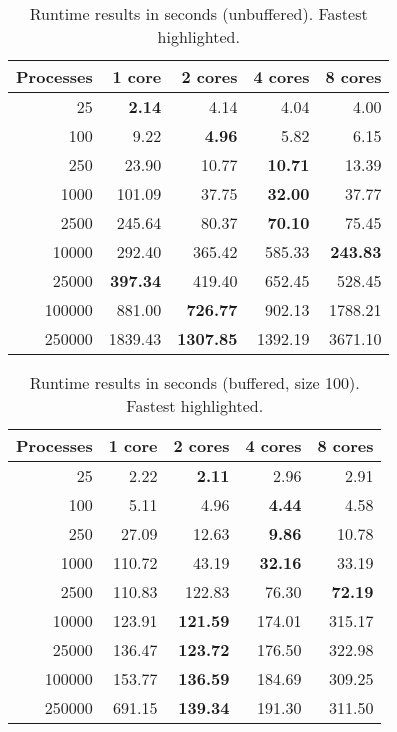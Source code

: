 \begin{table}
	\caption{Runtime results in seconds (unbuffered). Fastest highlighted.}
	\label{tab:runtime-unbuffered}
	\begin{tabular}{rrrrr}
		\hline
		Processes & 1 core & 2 cores & 4 cores & 8 cores\\
		\hline
		25 & \textbf{2.14} & 4.14 & 4.04 & 4.00 \\
		100 & 9.22 & \textbf{4.96} & 5.82 & 6.15 \\
		250 & 23.90 & 10.77 & \textbf{10.71} & 13.39 \\
		1000 & 101.09 & 37.75 & \textbf{32.00} & 37.77 \\
		2500 & 245.64 & 80.37 & \textbf{70.10} & 75.45 \\
		10000 & 292.40 & 365.42 & 585.33 & \textbf{243.83} \\
		25000 & \textbf{397.34} & 419.40 & 652.45 & 528.45 \\
		100000 & 881.00 & \textbf{726.77} & 902.13 & 1788.21 \\
		250000 & 1839.43 & \textbf{1307.85} & 1392.19 & 3671.10 \\
		\hline
	\end{tabular}
\end{table}

\begin{table}
	\caption{Runtime results in seconds (buffered, size 100). Fastest highlighted.}
	\label{tab:runtime-buffered}
	\begin{tabular}{rrrrr}
		\hline
		Processes & 1 core & 2 cores & 4 cores & 8 cores\\
		\hline
		25 & 2.22 & \textbf{2.11} & 2.96 & 2.91 \\
		100 & 5.11 & 4.96 & \textbf{4.44} & 4.58 \\
		250 & 27.09 & 12.63 & \textbf{9.86} & 10.78 \\
		1000 & 110.72 & 43.19 & \textbf{32.16} & 33.19 \\
		2500 & 110.83 & 122.83 & 76.30 & \textbf{72.19} \\
		10000 & 123.91 & \textbf{121.59} & 174.01 & 315.17 \\
		25000 & 136.47 & \textbf{123.72} & 176.50 & 322.98 \\
		100000 & 153.77 & \textbf{136.59} & 184.69 & 309.25 \\
		250000 & 691.15 & \textbf{139.34} & 191.30 & 311.50 \\
		\hline
	\end{tabular}
\end{table}


